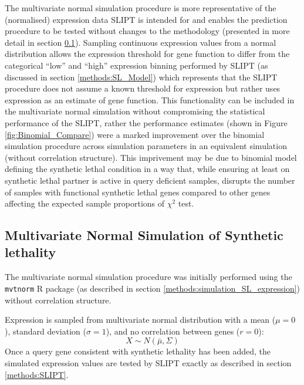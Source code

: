 The multivariate normal simulation procedure is more representative of the (normalised) expression data SLIPT is intended for and enables the prediction procedure to be tested without changes to the methodology (presented in more detail in section \ref{chapt2:simulation_mvtnorm}). Sampling continuous expression values from a normal distribution allows the expression threshold for gene function to differ from the categorical ``low'' and ``high'' expression binning performed by SLIPT (as discussed in section \ref{methods:SL_Model}) which represents that the SLIPT procedure does not assume a known threshold for expression but rather uses expression as an estimate of gene function. This functionality can be included in the multivariate normal simulation without compromising the statistical performance of the SLIPT, rather the performance estimates (shown in Figure \ref{fig:Binomial_Compare}) were a marked improvement over the binomial simulation procedure across simulation parameters in an equivalent simulation (without correlation structure). This imprivement may be due to binomial model defining the synthetic lethal condition in a way that, while ensuring at least on synthetic lethal partner is active in query deficient samples, disrupts the number of samples with functional synthetic lethal genes compared to other genes affecting the expected sample proportions of $\chi^2$ test.

\FloatBarrier

\subsection{Multivariate Normal Simulation of Synthetic lethality} \label{chapt2:simulation_mvtnorm}

The multivariate normal simulation procedure was initially performed using the \texttt{mvtnorm} R package \citep{Genz2009, mvtnorm} (as described in section \ref{methods:simulation_SL_expression}) without correlation structure.

Expression is sampled from multivariate normal distribution with a mean ($\mu = 0$), standard deviation ($\sigma = 1$), and no correlation between genes ($r = 0$): $$X\sim N(\bar{\mu},\Sigma)$$  Once a query gene consistent with synthetic lethality has been added, the simulated expression values are tested by SLIPT exactly as described in section \ref{methods:SLIPT}.

